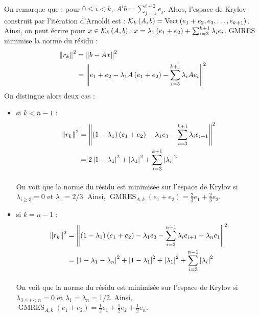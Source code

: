   \paragraph{}
  On remarque que : pour $0 \le i < k,\; A^ib = \sum_{j=1}^{i+2} e_j$.
  Alors, l'espace de Krylov construit par l'itération d'Arnoldi est : $\krylov[A, b]{k} = \operatorname{Vect}\left(e_1 + e_2, e_3,\dots, e_{k+1}\right)$.
  Ainsi, on peut écrire pour $x\in\krylov[A, b]{k} : x = \lambda_1\left(e_1 + e_2\right) + \sum_{i=3}^{k+1} \lambda_i e_i$.
  GMRES minimise la norme du résidu :
  \begin{align*}
    \norm{r_k}^2 &= \norm{b - Ax}^2 \\
                 &= \norm{e_1 + e_2 - \lambda_1 A\left(e_1 + e_2\right) - \sum_{i=3}^{k+1} \lambda_i Ae_i}^2
  \end{align*}
  On distingue alors deux cas :
  \begin{itemize}
    \item si $k < n-1$ :
      \begin{align*}
        \norm{r_k}^2 &= \norm{\left(1 - \lambda_1\right)\left(e_1 + e_2\right) - \lambda_1 e_3 - \sum_{i=3}^{k+1} \lambda_ie_{i+1}}^2 \\
                     &= 2\left|1 - \lambda_1\right|^2 + \left|\lambda_1\right|^2 + \sum_{i=3}^{k+1} \left|\lambda_i\right|^2
      \end{align*}

      \paragraph{}
      On voit que la norme du résidu est minimisée sur l'espace de Krylov si $\lambda_{i\ge 3} = 0$ et $\lambda_1 = 2/3$.
      Ainsi, $\operatorname{GMRES}_{A, k}\left(e_1 + e_2\right) = \frac{2}{3}e_1 + \frac{2}{3}e_2$.
    \vspace{\baselineskip}
    \item si $k = n-1$ :
      \begin{align*}
        \norm{r_k}^2 &= \norm{\left(1 - \lambda_1\right)\left(e_1 + e_2\right) - \lambda_1 e_3 - \sum_{i=3}^{n-1} \lambda_ie_{i+1} - \lambda_n e_1}^2 \\
                     &= \left|1 - \lambda_1 - \lambda_n\right|^2 + \left|1 - \lambda_1\right|^2 + \left|\lambda_1\right|^2 + \sum_{i=3}^{n-1} \left|\lambda_i\right|^2
      \end{align*}

      \paragraph{}
      On voit que la norme du résidu est minimisée sur l'espace de Krylov si $\lambda_{3\le i < n} = 0$ et $\lambda_1 = \lambda_n = 1/2$.
      Ainsi, $\operatorname{GMRES}_{A, k}\left(e_1 + e_2\right) = \frac{1}{2}e_1 + \frac{1}{2}e_2 + \frac{1}{2}e_n$.
  \end{itemize}


